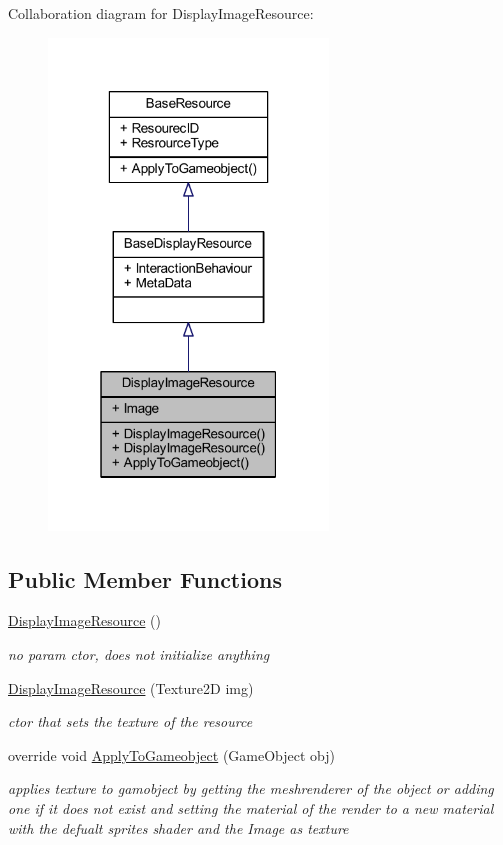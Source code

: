 Collaboration diagram for Display\+Image\+Resource\+:\nopagebreak
\begin{figure}[H]
\begin{center}
\leavevmode
\includegraphics[width=211pt]{class_display_image_resource__coll__graph}
\end{center}
\end{figure}
\subsection*{Public Member Functions}
\begin{DoxyCompactItemize}
\item 
\mbox{\hyperlink{class_display_image_resource_a8c3e434da20e617201d74cfdb913817b}{Display\+Image\+Resource}} ()
\begin{DoxyCompactList}\small\item\em no param ctor, does not initialize anything \end{DoxyCompactList}\item 
\mbox{\hyperlink{class_display_image_resource_aa7b4bf3e8d324ea5b789322748b21b8e}{Display\+Image\+Resource}} (Texture2D img)
\begin{DoxyCompactList}\small\item\em ctor that sets the texture of the resource \end{DoxyCompactList}\item 
override void \mbox{\hyperlink{class_display_image_resource_a26992a5ecb6c449d85539cc5d07112e2}{Apply\+To\+Gameobject}} (Game\+Object obj)
\begin{DoxyCompactList}\small\item\em applies texture to gamobject by getting the meshrenderer of the object or adding one if it does not exist and setting the material of the render to a new material with the defualt sprites shader and the Image as texture \end{DoxyCompactList}\end{DoxyCompactItemize}
